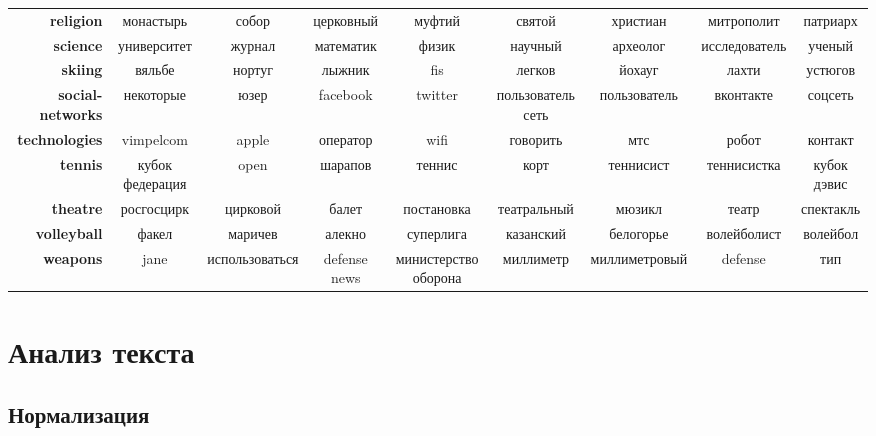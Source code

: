 \documentclass[a4paper, 14pt]{extarticle}
\begin{document}
\begin{table}
{\begin{tabular}{r|cccccccc}
			\textbf{religion}        &          монастырь &           собор &          церковный &                муфтий &                святой &       христиан &       митрополит &        патриарх \\
			\textbf{science}         &        университет &          журнал &          математик &                 физик &               научный &       археолог &    исследователь &          ученый \\
			\textbf{skiing}          &             вяльбе &          нортуг &             лыжник &                   fis &                легков &         йохауг &            лахти &         устюгов \\
			\textbf{social-networks} &          некоторые &            юзер &           facebook &               twitter &     пользователь сеть &   пользователь &        вконтакте &         соцсеть \\
			\textbf{technologies}    &          vimpelcom &           apple &           оператор &                  wifi &              говорить &            мтс &            робот &         контакт \\
			\textbf{tennis}          &    кубок федерация &            open &            шарапов &                теннис &                  корт &      теннисист &      теннисистка &     кубок дэвис \\
			\textbf{theatre}         &         росгосцирк &        цирковой &              балет &            постановка &           театральный &         мюзикл &            театр &       спектакль \\
			\textbf{volleyball}      &              факел &         маричев &             алекно &             суперлига &             казанский &      белогорье &      волейболист &        волейбол \\
			\textbf{weapons}         &               jane &  использоваться &       defense news &  министерство оборона &             миллиметр &  миллиметровый &          defense &             тип \\
		\end{tabular}
		}
	\label{word_feachers}
\end{table}


\section{Анализ текста}
\subsection{Нормализация}
\end{document}
